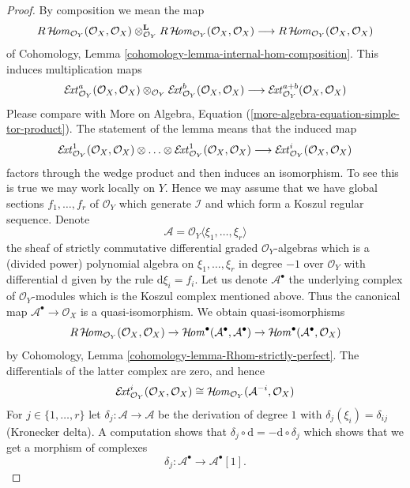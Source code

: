 \begin{proof}
By composition we mean the map
$$
R\mathop{\mathcal{H}\!\mathit{om}}\nolimits_{\mathcal{O}_Y}(\mathcal{O}_X, \mathcal{O}_X)
\otimes_{\mathcal{O}_Y}^\mathbf{L}
R\mathop{\mathcal{H}\!\mathit{om}}\nolimits_{\mathcal{O}_Y}(\mathcal{O}_X, \mathcal{O}_X)
\longrightarrow
R\mathop{\mathcal{H}\!\mathit{om}}\nolimits_{\mathcal{O}_Y}(\mathcal{O}_X, \mathcal{O}_X)
$$
of Cohomology, Lemma \ref{cohomology-lemma-internal-hom-composition}.
This induces multiplication maps
$$
\mathop{\mathcal{E}\!\mathit{xt}}\nolimits^a_{\mathcal{O}_Y}(\mathcal{O}_X, \mathcal{O}_X)
\otimes_{\mathcal{O}_Y}
\mathop{\mathcal{E}\!\mathit{xt}}\nolimits^b_{\mathcal{O}_Y}(\mathcal{O}_X, \mathcal{O}_X)
\longrightarrow
\mathop{\mathcal{E}\!\mathit{xt}}\nolimits^{a + b}_{\mathcal{O}_Y}(\mathcal{O}_X, \mathcal{O}_X)
$$
Please compare with
More on Algebra, Equation (\ref{more-algebra-equation-simple-tor-product}).
The statement of the lemma means that the induced map
$$
\mathop{\mathcal{E}\!\mathit{xt}}\nolimits^1_{\mathcal{O}_Y}(\mathcal{O}_X, \mathcal{O}_X)
\otimes \ldots \otimes
\mathop{\mathcal{E}\!\mathit{xt}}\nolimits^1_{\mathcal{O}_Y}(\mathcal{O}_X, \mathcal{O}_X)
\longrightarrow
\mathop{\mathcal{E}\!\mathit{xt}}\nolimits^i_{\mathcal{O}_Y}(\mathcal{O}_X, \mathcal{O}_X)
$$
factors through the wedge product and then induces an isomorphism.
To see this is true we may work locally on $Y$. Hence we may assume
that we have global sections $f_1, \ldots, f_r$ of $\mathcal{O}_Y$
which generate $\mathcal{I}$ and which form a Koszul regular sequence.
Denote
$$
\mathcal{A} = \mathcal{O}_Y\langle \xi_1, \ldots, \xi_r\rangle
$$
the sheaf of strictly commutative differential graded $\mathcal{O}_Y$-algebras
which is a (divided power) polynomial algebra on
$\xi_1, \ldots, \xi_r$ in degree $-1$ over $\mathcal{O}_Y$
with differential $\text{d}$ given by the rule $\text{d}\xi_i = f_i$.
Let us denote $\mathcal{A}^\bullet$ the underlying
complex of $\mathcal{O}_Y$-modules which is the Koszul complex
mentioned above. Thus the canonical map
$\mathcal{A}^\bullet \to \mathcal{O}_X$
is a quasi-isomorphism. We obtain quasi-isomorphisms
$$
R\mathop{\mathcal{H}\!\mathit{om}}\nolimits_{\mathcal{O}_Y}(\mathcal{O}_X, \mathcal{O}_X) \to
\mathop{\mathcal{H}\!\mathit{om}}\nolimits^\bullet(\mathcal{A}^\bullet, \mathcal{A}^\bullet) \to
\mathop{\mathcal{H}\!\mathit{om}}\nolimits^\bullet(\mathcal{A}^\bullet, \mathcal{O}_X)
$$
by Cohomology, Lemma \ref{cohomology-lemma-Rhom-strictly-perfect}.
The differentials of the latter complex are zero, and hence
$$
\mathop{\mathcal{E}\!\mathit{xt}}\nolimits^i_{\mathcal{O}_Y}(\mathcal{O}_X, \mathcal{O}_X)
\cong \mathop{\mathcal{H}\!\mathit{om}}\nolimits_{\mathcal{O}_Y}(\mathcal{A}^{-i}, \mathcal{O}_X)
$$
For $j \in \{1, \ldots, r\}$ let $\delta_j : \mathcal{A} \to \mathcal{A}$
be the derivation of degree $1$ with $\delta_j(\xi_i) = \delta_{ij}$
(Kronecker delta). A computation shows that
$\delta_j \circ \text{d} = - \text{d} \circ \delta_j$ which shows that
we get a morphism of complexes
$$
\delta_j : \mathcal{A}^\bullet \to \mathcal{A}^\bullet[1].
$$
\end{proof}
